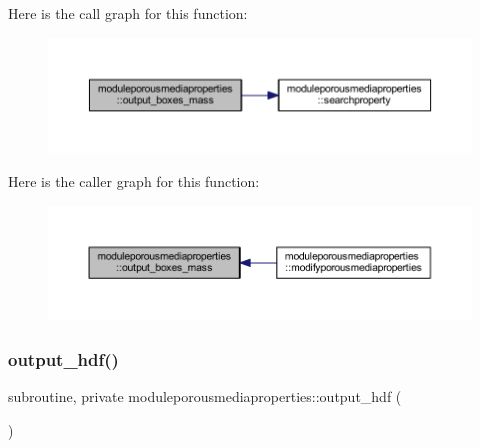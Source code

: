 Here is the call graph for this function\+:\nopagebreak
\begin{figure}[H]
\begin{center}
\leavevmode
\includegraphics[width=350pt]{namespacemoduleporousmediaproperties_a4763c798964b2cbb6e1e012ba2141ff8_cgraph}
\end{center}
\end{figure}
Here is the caller graph for this function\+:\nopagebreak
\begin{figure}[H]
\begin{center}
\leavevmode
\includegraphics[width=350pt]{namespacemoduleporousmediaproperties_a4763c798964b2cbb6e1e012ba2141ff8_icgraph}
\end{center}
\end{figure}
\mbox{\label{namespacemoduleporousmediaproperties_afc8549b6ebf2207ac8a080ad892a6cd3}} 
\subsubsection{\texorpdfstring{output\+\_\+hdf()}{output\_hdf()}}
{\footnotesize\ttfamily subroutine, private moduleporousmediaproperties\+::output\+\_\+hdf (\begin{DoxyParamCaption}{ }\end{DoxyParamCaption})\hspace{0.3cm}{\ttfamily [private]}}

